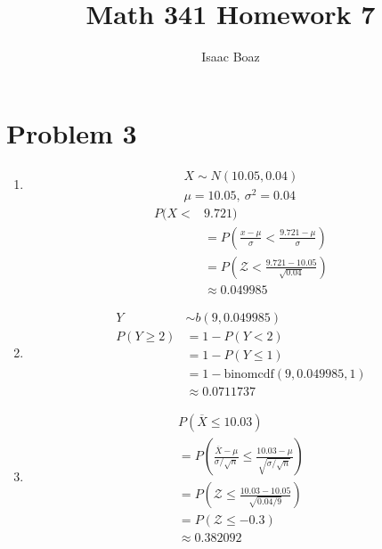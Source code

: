\documentclass{article}
\title{\vspace{-4ex}Math 341 Homework 7}
\author{Isaac Boaz}
\begin{document}
\maketitle

\section*{Problem 3}
\begin{enumerate}[label=(\alph*)]
    \item \begin{align*}
              X \sim N(10.05, 0.04) \\
              \mu = 10.05,\ \sigma^2 = 0.04
          \end{align*}
          \begin{align*}
              P(X < & 9.721)                                               \\
                    & = P(\frac{x-\mu}{\sigma} < \frac{9.721-\mu}{\sigma}) \\
                    & = P(\mathcal{Z} < \frac{9.721-10.05}{\sqrt{0.04}})   \\
                    & \approx 0.049985
          \end{align*}
    \item \begin{align*}
              Y           & \sim b(9, 0.049985)                   \\
              P(Y \geq 2) & = 1 - P(Y < 2)                        \\
                          & = 1 - P(Y \leq 1)                     \\
                          & = 1 - \text{binomcdf}(9, 0.049985, 1) \\
                          & \approx 0.0711737
          \end{align*}
    \item \begin{align*}
              P(\overline{X} \leq 10.03)                                                                    \\
              = P(\frac{\overline{X} - \mu}{\sigma/\sqrt{n}} \leq \frac{10.03-\mu}{\sqrt{\sigma/\sqrt{n}}}) \\
              = P(\mathcal{Z} \leq \frac{10.03-10.05}{\sqrt{0.04/9}})                                       \\
              = P(\mathcal{Z} \leq -0.3)                                                                    \\
              \approx 0.382092
          \end{align*}
\end{enumerate}
\end{document}
